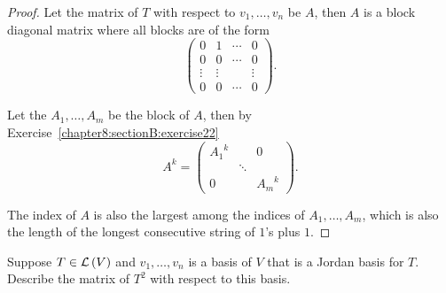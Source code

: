 \begin{proof}
    Let the matrix of $T$ with respect to $v_{1}, \ldots, v_{n}$ be $A$, then $A$ is a block diagonal matrix where all blocks are of the form
    \[
        \begin{pmatrix}
            0      & 1      & \cdots & 0      \\
            0      & 0      & \cdots & 0      \\
            \vdots & \vdots &        & \vdots \\
            0      & 0      & \cdots & 0
        \end{pmatrix}.
    \]

    Let the $A_{1}, \ldots, A_{m}$ be the block of $A$, then by Exercise~\ref{chapter8:sectionB:exercise22}
    \[
        A^{k} = \begin{pmatrix}
            {A_{1}}^{k} &        & 0           \\
                        & \ddots &             \\
            0           &        & {A_{m}}^{k}
        \end{pmatrix}.
    \]

    The index of $A$ is also the largest among the indices of $A_{1}, \ldots, A_{m}$, which is also the length of the longest consecutive string of $1$'s plus $1$.
\end{proof}
\newpage

\begin{exercise}\label{chapter8:sectionC:exercise8}
    Suppose $T\in\mathcal{L}\left({V}\right)$ and $v_{1}, \ldots, v_{n}$ is a basis of $V$ that is a Jordan basis for $T$. Describe the matrix of $T^{2}$ with respect to this basis.
\end{exercise}

